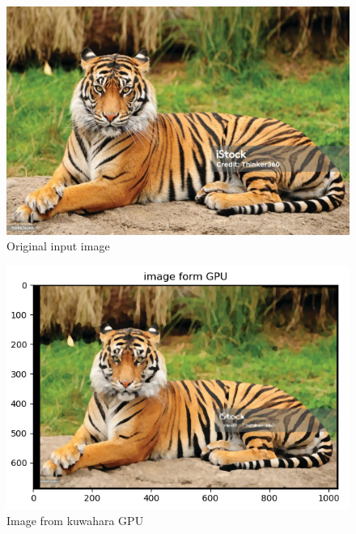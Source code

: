 \documentclass{article}
\begin{document}
\begin{figure}[b]
\begin{center}
   \includegraphics[scale=1.5]{tiger.jpg}
\end{center}
\caption{Original input image}
\end{figure}

\begin{figure}[b]
\begin{center}
   \includegraphics[scale=0.7]{image_from_gpu.png}
\end{center}
\caption{Image from kuwahara GPU }
\end{figure}
\end{document}
